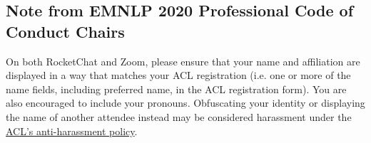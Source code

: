 \documentclass[11pt]{scrartcl}
\newcommand{\conferenceName}{EMNLP 2020\xspace}
\begin{document}
\subsection*{Note from \conferenceName Professional Code of Conduct Chairs}

On both RocketChat and Zoom, please ensure that your name and affiliation are displayed in a way that matches your ACL registration (i.e. one or more of the name fields, including preferred name, in the ACL registration form). You are also encouraged to include your pronouns. Obfuscating your identity or displaying the name of another attendee instead may be considered harassment under the \href{https://www.aclweb.org/adminwiki/index.php?title=Anti-Harassment_Policy}{ACL's anti-harassment policy}.
\end{document}
